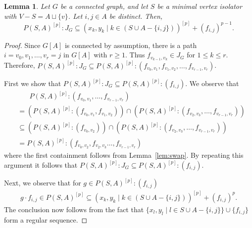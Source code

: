 \documentclass[10pt,a4paper]{amsart}
\newtheorem{lemma}{Lemma}
\renewcommand{\subset}{\subseteq}
\begin{document}
\begin{lemma}\label{lem:one:colon}
Let $G$ be a connected graph, and let $S$ be a minimal vertex isolator with $V-S = A \sqcup \{v\}$.  Let $i,j \in A$ be distinct.  Then, \[P(S,A)^{[p]}:J_G \subseteq (x_k,y_k\mid k \in (S \cup A - \{i,j\}))^{[p]} + (f_{i,j})^{p-1}.\]
\end{lemma}

\begin{proof}
    Since $G[A]$ is connected by assumption, there is a path $i = v_0,v_1,\ldots,v_r = j$ in $G[A]$ with $r \geq 1$.  Thus $f_{v_{k-1},v_k} \in J_G$ for $1 \le k \le r$.  Therefore, $P(S,A)^{[p]}:J_G \subseteq P(S,A)^{[p]}:(f_{v_0,v_1},f_{v_1,v_2},\ldots,f_{v_{r-1},v_r})$.  
    
    First we show that $P(S,A)^{[p]}:J_G \subseteq P(S,A)^{[p]}:(f_{i,j})$. We observe that
    \begin{align*}
        &\phantom{=(} P(S,A)^{[p]}:(f_{v_0,v_1},\ldots,f_{v_{r-1},v_r}) \\&= \left( P(S,A)^{[p]}:(f_{v_0,v_1},f_{v_1,v_2}) \right) \cap \left( P(S,A)^{[p]}:(f_{v_2,v_3},\ldots,f_{v_{r-1},v_r})\right) \\
        &\subseteq  \left( P(S,A)^{[p]}:(f_{v_0,v_2})\right) \cap \left(P(S,A)^{[p]}:(f_{v_2,v_3},\ldots,f_{v_{r-1},v_r}) \right)\\
        &= P(S,A)^{[p]}:(f_{v_0,v_2},f_{v_2,v_3}\ldots,f_{v_{r-1},v_r})
    \end{align*}
    where the first containment follows from Lemma~\ref{lem:swap}. By repeating this argument it follows that $P(S,A)^{[p]}:J_G \subseteq P(S,A)^{[p]}:(f_{i,j})$.
    
    Next, we observe that for $g \in P(S,A)^{[p]}:(f_{i,j})$
    \begin{align*}
        g \cdot f_{i,j} \in P(S,A)^{[p]} \subset (x_k,y_k\mid k \in (S \cup A - \{i,j\}))^{[p]} + (f_{i,j})^{p}.
    \end{align*}
    The conclusion now follows from the fact that $\{x_l,y_l \mid l \in S \cup A - \{i,j\}\} \cup \{f_{i,j}\}$ form a regular sequence.
\end{proof}
\end{document}
